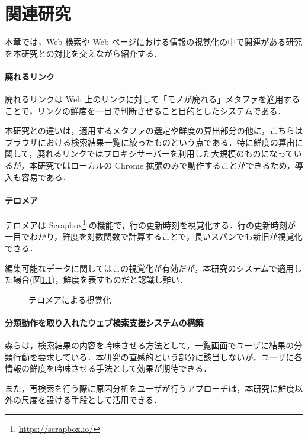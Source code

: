\chapter{関連研究}
\label{chap:survey}

本章では，Web 検索や Web ページにおける情報の視覚化の中で関連がある研究を本研究との対比を交えながら紹介する．

\newpage

\subsubsection{廃れるリンク}

廃れるリンク\cite{dyinglink}は Web 上のリンクに対して「モノが廃れる」メタファを適用することで，リンクの鮮度を一目で判断させること目的としたシステムである．

本研究との違いは，適用するメタファの選定や鮮度の算出部分の他に，こちらはブラウザにおける検索結果一覧に絞ったものという点である．特に鮮度の算出に関して，廃れるリンクではプロキシサーバーを利用した大規模のものになっているが，本研究ではローカルの Chrome 拡張のみで動作することができるため，導入も容易である．

\subsubsection{テロメア}

テロメア\cite{telomere}は Scrapbox\footnote{\url{https://scrapbox.io/}} の機能で，行の更新時刻を視覚化する．行の更新時刻が一目でわかり，鮮度を対数関数で計算することで，長いスパンでも新旧が視覚化できる．

編集可能なデータに関してはこの視覚化が有効だが，本研究のシステムで適用した場合(図\ref{fig:ver-telomere})，鮮度を表すものだと認識し難い．

\begin{figure}[htbp]
  \begin{center}
  \end{center}
  \caption{テロメアによる視覚化}
  \label{fig:ver-telomere}
\end{figure}

\subsubsection{分類動作を取り入れたウェブ検索支援システムの構築}

森\cite{classify}らは，検索結果の内容を吟味させる方法として，一覧画面でユーザに結果の分類行動を要求している．本研究の直感的という部分に該当しないが，ユーザに各情報の鮮度を吟味させる手法として効果が期待できる．

また，再検索を行う際に原因分析をユーザが行うアプローチは，本研究に鮮度以外の尺度を設ける手段として活用できる．
